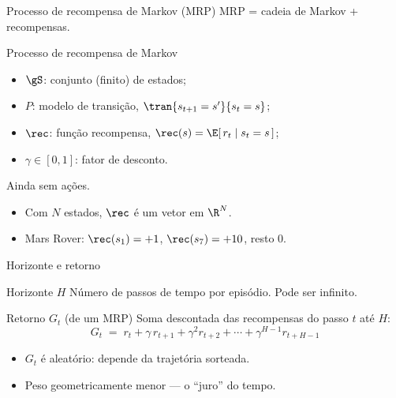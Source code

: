 \documentclass[aspectratio=169, 11pt]{beamer}
\begin{document}
\begin{frame}{Processo de recompensa de Markov (MRP)}
  MRP = cadeia de Markov \alert{+ recompensas}.

  \begin{defbox}{Processo de recompensa de Markov}
    \begin{itemize}
      \item $\gS$: conjunto (finito) de estados;
      \item $P$: modelo de transição, $\tran{s_{t+1}=s'}{s_t=s}$;
      \item $\rec$: função recompensa, $\rec(s) = \E[\, r_t \mid s_t = s \,]$;
      \item $\gamma \in [0,1]$: fator de desconto.
    \end{itemize}
    Ainda sem ações.
  \end{defbox}

  \begin{itemize}
    \item Com $N$ estados, $\rec$ é um vetor em $\R^N$.
    \item Mars Rover: $\rec(s_1) = +1$, $\rec(s_7) = +10$, resto $0$.
  \end{itemize}
\end{frame}

\begin{frame}{Horizonte e retorno}
  \begin{defbox}{Horizonte $H$}
    Número de passos de tempo por episódio. Pode ser infinito.
  \end{defbox}

  \begin{defbox}{Retorno $G_t$ (de um MRP)}
    Soma descontada das recompensas do passo $t$ até $H$:
    \[
      G_t \;=\; r_t + \gamma\, r_{t+1} + \gamma^2 r_{t+2} + \cdots
              + \gamma^{H-1} r_{t+H-1}
    \]
  \end{defbox}

  \begin{itemize}
    \item $G_t$ é \alert{aleatório}: depende da trajetória sorteada.
    \item Peso geometricamente menor — o ``juro'' do tempo.
  \end{itemize}
\end{frame}
\end{document}
